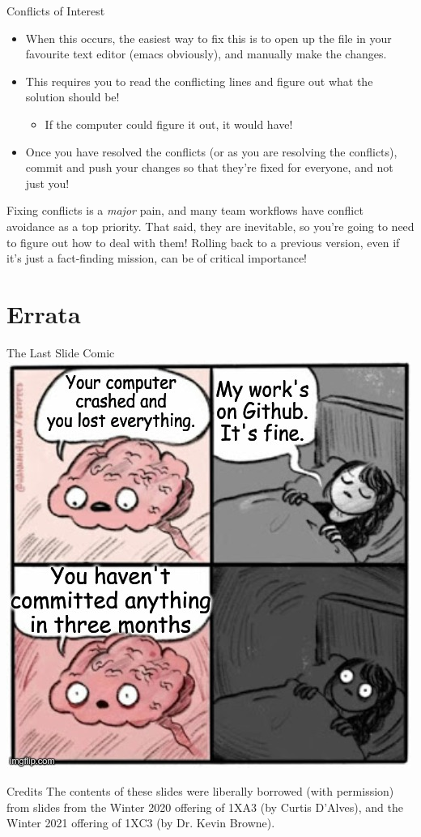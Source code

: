 \documentclass[11pt]{beamer}
\begin{document}
\begin{frame}{Conflicts of Interest}
\begin{itemize}
\item When this occurs, the easiest way to fix this is to open up the file in your favourite text editor (emacs obviously), and manually make the changes.
\item This requires you to read the conflicting lines and figure out what the solution should be! 
\begin{itemize}
\item If the computer could figure it out, it would have! 
\end{itemize}
\item Once you have resolved the conflicts (or as you are resolving the conflicts), commit and push your changes so that they're fixed for everyone, and not just you! 
\end{itemize}
Fixing conflicts is a \emph{major} pain, and many team workflows have conflict avoidance as a top priority.  
That said, they are inevitable, so you're going to need to figure out how to deal with them!  Rolling back to a previous version, even if it's just a fact-finding mission, can be of critical importance!
\end{frame}

\section[Errata]{Errata}
\begin{frame}{The Last Slide Comic}
\center
\includegraphics[scale=0.35]{meme2.jpg}
\end{frame}

\begin{frame}{Credits}
\center
\vspace{8em}
The contents of these slides were liberally borrowed (with permission) from slides from the Winter 2020 offering of 1XA3 (by Curtis D'Alves), and the Winter 2021 offering of 1XC3 (by Dr. Kevin Browne).  
\end{frame}
\end{document}
